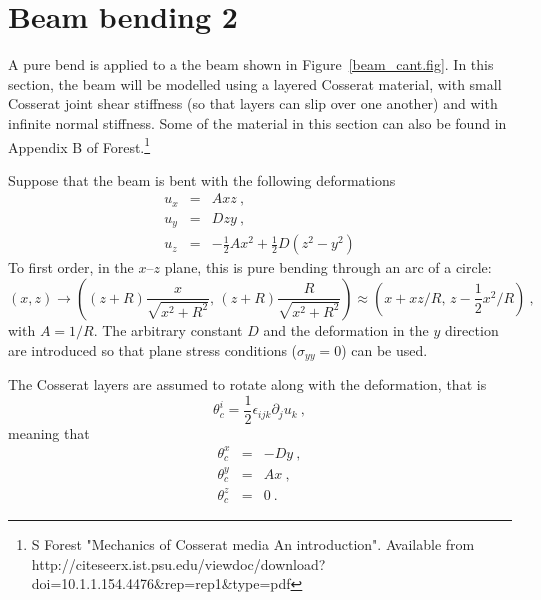 \documentclass[]{scrreprt}
\begin{document}
\chapter{Beam bending 2}

A pure bend is applied to a the beam shown in
Figure~\ref{beam_cant.fig}.  In this section, the beam will be
modelled using a layered Cosserat material, with small Cosserat joint
shear stiffness (so that layers can slip over one another) and with
infinite normal stiffness.  Some of the material in this section can also be
found in Appendix B of Forest.\footnote{S Forest "Mechanics of
  Cosserat media An introduction".  Available from
  http://citeseerx.ist.psu.edu/viewdoc/download?doi=10.1.1.154.4476\&rep=rep1\&type=pdf}

Suppose that the beam is bent with the following deformations
\begin{eqnarray}
u_{x} & = & Axz \ , \\
u_{y} & = & Dzy \ , \\
u_{z} & = & -\mbox{$\frac{1}{2}$}Ax^{2} + \mbox{$\frac{1}{2}$}D(z^{2}
- y^{2})
\end{eqnarray}
To first order, in the $x$--$z$ plane, this is pure bending through an
arc of a circle:
\begin{equation}
(x, z) \rightarrow \left( (z+R)\frac{x}{\sqrt{x^{2}+R^{2}}},\,
(z+R)\frac{R}{\sqrt{x^{2}+R^{2}}} \right) \approx \left(x + xz/R,\,
 z -\mbox{$\frac{1}{2}$}x^{2}/R \right) \ ,
\end{equation}
with $A=1/R$.  The arbitrary constant $D$ and the deformation in the
$y$ direction are introduced so that plane
stress conditions ($\sigma_{yy}=0$) can be used.

The Cosserat layers are assumed to rotate along with the deformation,
that is
\begin{equation}
\theta_{c}^{i} = \mbox{$\frac{1}{2}$}\epsilon_{ijk}\partial_{j}u_{k}
\ ,
\end{equation}
meaning that
\begin{eqnarray}
\theta_{c}^{x} & = & -Dy \ , \\
\theta_{c}^{y} & = & Ax \ , \\
\theta_{c}^{z} & = & 0 \ .
\end{eqnarray}
\end{document}
